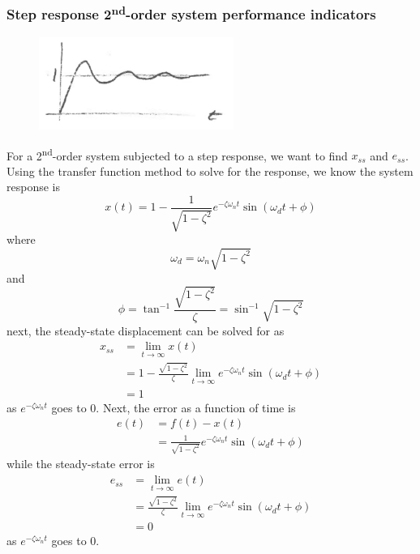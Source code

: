 \documentclass[12pt,letter]{article}
\begin{document}
\subsubsection{Step response 2\textsuperscript{nd}-order system performance indicators}


\begin{figure}[H]
	\centering
	\includegraphics[width=2.5in]{../figures/step_response_2nd_order_with_steady_state_error}
\end{figure}

For a 2\textsuperscript{nd}-order system subjected to a step response, we want to find $x_{ss}$ and $e_{ss}$. Using the transfer function method to solve for the response, we know the system response is
\begin{equation}
x(t) = 1 - \frac{1}{\sqrt{1-\zeta^2}} e^{-\zeta \omega_n t} \sin (\omega_d t + \phi)
\end{equation}
where 
\begin{equation}
\omega_d = \omega_n \sqrt{1-\zeta^2}
\end{equation}
and 
\begin{equation}
\phi = \tan^{-1} \frac{\sqrt{1-\zeta^2}}{\zeta} = \sin^{-1} \sqrt{1-\zeta^2}
\end{equation}
next, the steady-state displacement can be solved for as
\begin{align}
x_{ss} &= \lim\limits_{t \rightarrow \infty} x(t)\\
&= 1 - \frac{\sqrt{1-\zeta^2}}{\zeta}  \lim\limits_{t \rightarrow \infty}  e^{-\zeta \omega_n t} \sin (\omega_d t + \phi) \nonumber \\
&=  1 \nonumber
\end{align}
as $e^{-\zeta \omega_n t} $ goes to 0. Next, the error as a function of time is 
\begin{align}
e(t) &= f(t) - x(t) \\
&= \frac{1}{\sqrt{1-\zeta^2}} e^{-\zeta \omega_n t} \sin (\omega_d t + \phi) \nonumber
\end{align}
while the steady-state error is
\begin{align}
e_{ss} &= \lim\limits_{t \rightarrow \infty}e(t) \\
&=  \frac{\sqrt{1-\zeta^2}}{\zeta}  \lim\limits_{t \rightarrow \infty}  e^{-\zeta \omega_n t} \sin (\omega_d t + \phi) \nonumber \\
&= 0 \nonumber
\end{align}
as $e^{-\zeta \omega_n t} $ goes to 0.
\end{document}
